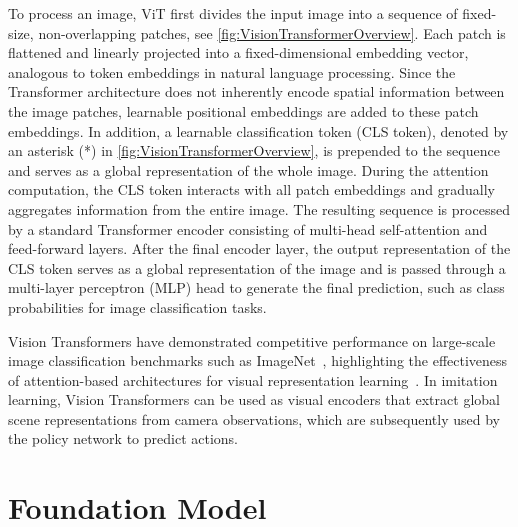 To process an image, ViT first divides the input image into a sequence of fixed-size, non-overlapping patches, see \autoref{fig:VisionTransformerOverview}. Each patch is flattened and linearly projected into a fixed-dimensional embedding vector, analogous to token embeddings in natural language processing.
Since the Transformer architecture does not inherently encode spatial information between the image patches, learnable positional embeddings are added to these patch embeddings. In addition, a learnable classification token (CLS token), denoted by an asterisk (*) in \autoref{fig:VisionTransformerOverview}, is prepended to the sequence and serves as a global representation of the whole image. During the attention computation, the CLS token interacts with all patch embeddings and gradually aggregates information from the entire image.
The resulting sequence is processed by a standard Transformer encoder consisting of multi-head self-attention and feed-forward layers. 
After the final encoder layer, the output representation of the CLS token serves as a global representation of the image and is passed through a multi-layer perceptron (MLP) head to generate the final prediction, such as class probabilities for image classification tasks.

Vision Transformers have demonstrated competitive performance on large-scale image classification benchmarks such as ImageNet~\cite{Deng2009ImageNetAL}, highlighting the effectiveness of attention-based architectures for visual representation learning~\cite{Dosovitskiy2020AnII}.
In imitation learning, Vision Transformers can be used as visual encoders that extract global scene representations from camera observations, which are subsequently used by the policy network to predict actions.







\section{Foundation Model}


